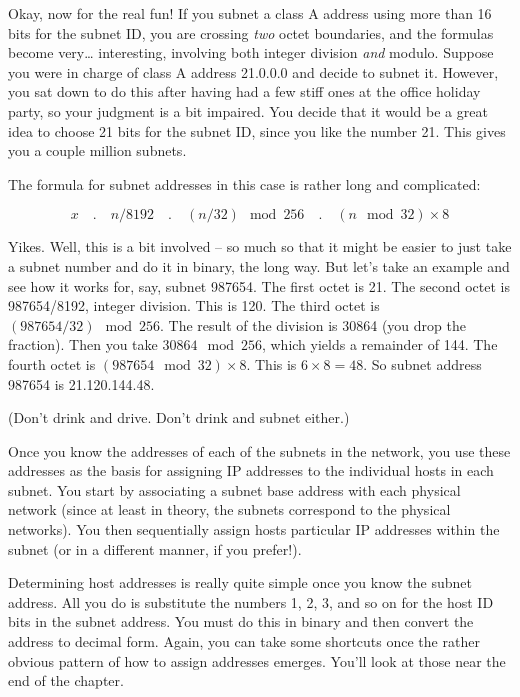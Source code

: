 Okay, now for the real fun! If you subnet a class A address using more
than 16 bits for the subnet ID, you are crossing {\emph{two}} octet
boundaries, and the formulas become very\ldots{} interesting, involving both integer division \emph{and} modulo.
Suppose you were in charge of class A address 21.0.0.0 and decide to subnet it.
However, you sat down to do this after having had a few stiff ones at the office holiday party, so your judgment is a bit impaired.
You decide that it would be a great idea to choose 21 bits for the subnet ID, since you like the number 21.
This gives you a couple million subnets.

The formula for subnet addresses in this case is rather long and complicated:

\[ x \quad.\quad n/8192 \quad.\quad (n/32)\mod 256 \quad.\quad (n\mod 32)\times 8 \]

Yikes.
Well, this is a bit involved -- so much so that it might be easier
to just take a subnet number and do it in binary, the long way. But
let's take an example and see how it works for, say, subnet 987654. The
first octet is 21. The second octet is 987654/8192, integer division.
This is 120. The third octet is $(987654/32)\mod 256$.
The result of the division is 30864 (you drop the fraction).
Then you take $30864\mod 256$, which yields a remainder of 144.
The fourth octet is $(987654\mod 32)\times 8$.
This is $6\times 8 = 48$.
So subnet address 987654 is 21.120.144.48.

(Don't drink and drive. Don't drink and subnet either.)

 

Once you know the addresses of each of the subnets in the network, you
use these addresses as the basis for assigning IP addresses to the
individual hosts in each subnet. You start by associating a subnet base
address with each physical network (since at least in theory, the
subnets correspond to the physical networks). You then sequentially
assign hosts particular IP addresses within the subnet (or in a
different manner, if you prefer!).

Determining host addresses is really quite simple once you know the subnet address.
All you do is substitute the numbers 1, 2, 3, and so on for the host ID bits in the subnet address.
You must do this in binary and then convert the address to decimal form.
Again, you can take some shortcuts once the rather obvious pattern of how to assign addresses emerges.
You'll look at those near the end of the chapter.




